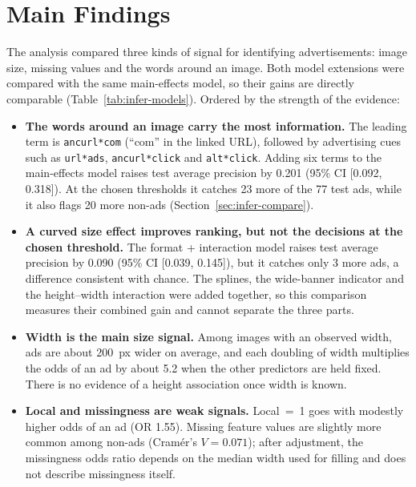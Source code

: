 \section{Main Findings}
The analysis compared three kinds of signal for identifying advertisements:
image size, missing values and the words around an image. Both model
extensions were compared with the same main-effects model, so their gains are
directly comparable (Table~\ref{tab:infer-models}). Ordered by the strength of
the evidence:

\begin{itemize}
\item \textbf{The words around an image carry the most information.} The
  leading term is \texttt{ancurl*com} (``com'' in the linked URL), followed
  by advertising cues such as \texttt{url*ads}, \texttt{ancurl*click} and
  \texttt{alt*click}. Adding six terms to the main-effects model raises test
  average precision by 0.201 (95\% CI [0.092, 0.318]). At the chosen
  thresholds it catches 23 more of the 77 test ads, while it also flags 20
  more non-ads (Section~\ref{sec:infer-compare}).
\item \textbf{A curved size effect improves ranking, but not the decisions at
  the chosen threshold.} The format + interaction model raises test average
  precision by 0.090 (95\% CI [0.039, 0.145]), but it catches only 3 more ads,
  a difference consistent with chance. The splines, the wide-banner indicator
  and the height--width interaction were added together, so this comparison
  measures their combined gain and cannot separate the three parts.
\item \textbf{Width is the main size signal.} Among images with an observed
  width, ads are about 200~px wider on average, and each doubling of width
  multiplies the odds of an ad by about 5.2 when the other predictors are
  held fixed. There is no evidence of a height association once width is
  known.
\item \textbf{Local and missingness are weak signals.} Local~=~1 goes with
  modestly higher odds of an ad (OR 1.55). Missing feature values are slightly
  more common among non-ads (Cram\'er's $V=0.071$); after adjustment, the
  missingness odds ratio depends on the median width used for filling and does
  not describe missingness itself.
\end{itemize}

